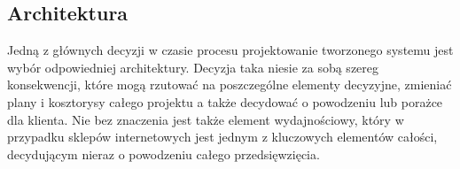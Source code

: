 \subsection{Architektura}

Jedną z głównych decyzji w czasie procesu projektowanie tworzonego systemu jest
wybór odpowiedniej architektury. Decyzja taka niesie za sobą szereg
konsekwencji, które mogą rzutować na poszczególne elementy decyzyjne, zmieniać
plany i kosztorysy całego projektu a także decydować o powodzeniu lub porażce
dla klienta. Nie bez znaczenia jest także element wydajnościowy, który w
przypadku sklepów internetowych jest jednym z kluczowych elementów całości,
decydującym nieraz o powodzeniu całego przedsięwzięcia.
